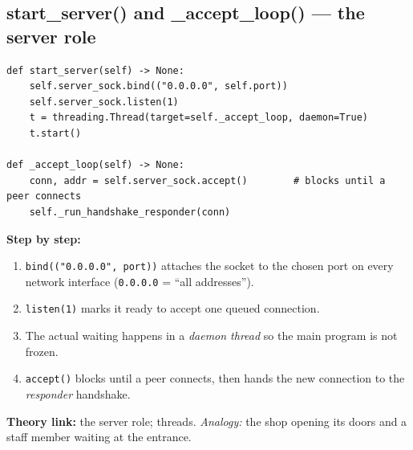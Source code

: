 \documentclass[11pt,a4paper]{article}
\begin{document}
\subsection{start\_server() and \_accept\_loop() --- the server role}
\begin{lstlisting}[style=py,caption={vehicle\_node.py --- listening for a peer.}]
def start_server(self) -> None:
    self.server_sock.bind(("0.0.0.0", self.port))
    self.server_sock.listen(1)
    t = threading.Thread(target=self._accept_loop, daemon=True)
    t.start()

def _accept_loop(self) -> None:
    conn, addr = self.server_sock.accept()        # blocks until a peer connects
    self._run_handshake_responder(conn)
\end{lstlisting}
\textbf{Step by step:}
\begin{enumerate}
  \item \texttt{bind(("0.0.0.0", port))} attaches the socket to the chosen port
        on every network interface (\texttt{0.0.0.0} = ``all addresses'').
  \item \texttt{listen(1)} marks it ready to accept one queued connection.
  \item The actual waiting happens in a \emph{daemon thread} so the main program
        is not frozen.
  \item \texttt{accept()} blocks until a peer connects, then hands the new
        connection to the \emph{responder} handshake.
\end{enumerate}
\textbf{Theory link:} the server role; threads. \emph{Analogy:} the shop opening
its doors and a staff member waiting at the entrance.
\end{document}
